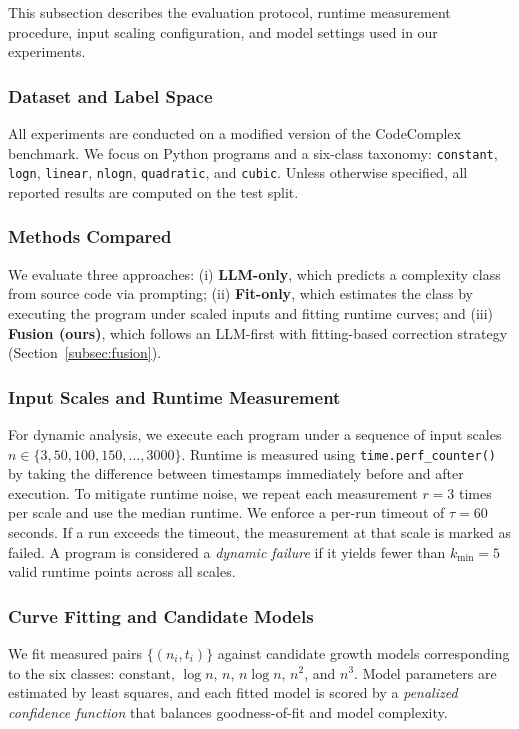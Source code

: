 \documentclass[conference]{IEEEtran}
\begin{document}
 This subsection describes the evaluation protocol, runtime measurement procedure, input scaling 
 configuration, and model settings used in our experiments. 
 
 \subsubsection{Dataset and Label Space} 
 \label{subsubsec:setup_dataset} 
 All experiments are conducted on a modified version of the CodeComplex benchmark. 
 We focus on Python programs and a six-class taxonomy: 
 \texttt{constant}, \texttt{logn}, \texttt{linear}, \texttt{nlogn}, \texttt{quadratic}, and \texttt{cubic}. 
 Unless otherwise specified, all reported results are computed on the test split. 
 
 \subsubsection{Methods Compared} 
 \label{subsubsec:setup_methods} 
 We evaluate three approaches: 
 (i) \textbf{LLM-only}, which predicts a complexity class from source code via prompting; 
 (ii) \textbf{Fit-only}, which estimates the class by executing the program under scaled inputs and fitting 
 runtime curves; and (iii) \textbf{Fusion (ours)}, which follows an LLM-first with fitting-based correction 
 strategy (Section~\ref{subsec:fusion}). 
 
 \subsubsection{Input Scales and Runtime Measurement} 
 \label{subsubsec:setup_runtime} 
 For dynamic analysis, we execute each program under a sequence of input scales 
 $n \in \{3, 50, 100, 150, \dots, 3000\}$. 
 Runtime is measured using \texttt{time.perf\_counter()} by taking the difference between timestamps 
 immediately before and after execution. 
 To mitigate runtime noise, we repeat each measurement $r=3$ times per scale and use the median runtime. 
 We enforce a per-run timeout of $\tau = 60$ seconds. If a run exceeds the timeout, the measurement at that 
 scale is marked as failed. A program is considered a \emph{dynamic failure} if it yields fewer than 
 $k_{\min}=5$ valid runtime points across all scales. 
 
 \subsubsection{Curve Fitting and Candidate Models} 
 \label{subsubsec:setup_fitting} 
 We fit measured pairs $\{(n_i, t_i)\}$ against candidate growth models corresponding to the six classes: 
 constant, $\log n$, $n$, $n\log n$, $n^2$, and $n^3$. 
 Model parameters are estimated by least squares, and each fitted model is scored by a 
 \emph{penalized confidence function} that balances goodness-of-fit and model complexity. 
 
\end{document}
